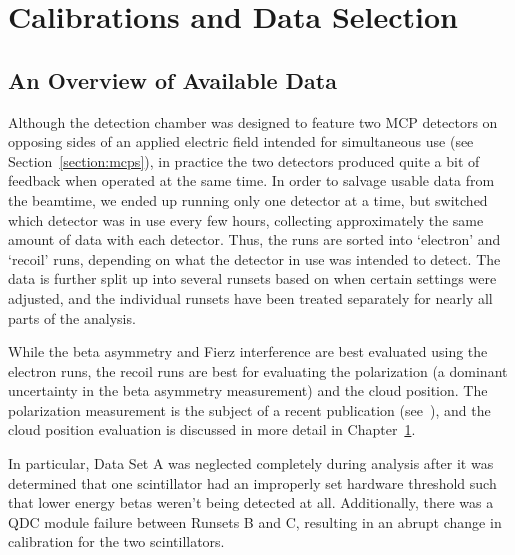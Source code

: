 %
%
%
\clearpage
\chapter{Calibrations and Data Selection}
\label{calibrations_chapter}
\label{dataselection_chapter}
\section{An Overview of Available Data}
\label{sec:data_overview}
Although the detection chamber was designed to feature two MCP detectors on opposing sides of an applied electric field intended for simultaneous use (see Section~\ref{section:mcps}), in practice the two detectors produced quite a bit of feedback when operated at the same time.  In order to salvage usable data from the beamtime, we ended up running only one detector at a time, but switched which detector was in use every few hours, collecting approximately the same amount of data with each detector.  Thus, the runs are sorted into `electron' and `recoil' runs, depending on what the detector in use was intended to detect.  The data is further split up into several runsets based on when certain settings were adjusted, and the individual runsets have been treated separately for nearly all parts of the analysis.

While the beta asymmetry and Fierz interference are best evaluated using the electron runs, the recoil runs are best for evaluating the polarization (a dominant uncertainty in the beta asymmetry measurement) and the cloud position.  The polarization measurement is the subject of a recent publication (see~\cite{ben_OP}), and the cloud position evaluation is discussed in more detail in Chapter~\ref{calibrations_chapter}.

In particular, Data Set A was neglected completely during analysis after it was determined that one scintillator had an improperly set hardware threshold such that lower energy betas weren't being detected at all.  Additionally, there was a QDC module failure between Runsets B and C, resulting in an abrupt change in calibration for the two scintillators.  
%

